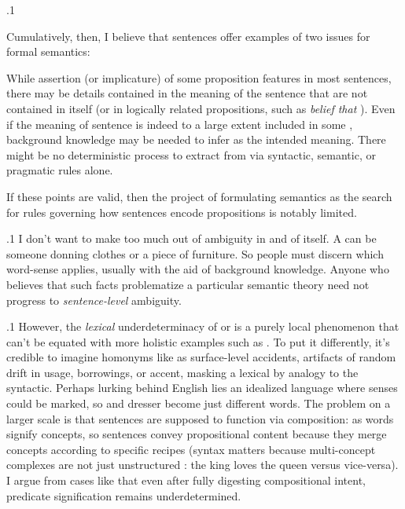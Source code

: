 \documentclass[11pt, twocolumn]{article}
\begin{document}
\p.1{%
\:\+Cumulatively, then, I believe that sentences \onethrft{} offer examples
of two issues for formal semantics:\< \vspace{5pt}

\begin{enums}

\enumsItem{}   \+While assertion (or implicature) of some proposition 
features in most sentences, there may be details contained in
the meaning of the sentence that are not contained in  itself
(or in logically related propositions, such as 
\textit{belief that }).\< 
\enumsItem{}   \+Even if the meaning of sentence  is indeed to a large extent included in some
, background knowledge may be needed to infer  as the intended
meaning. \> There might be no deterministic process to extract  from
 via syntactic, semantic, or pragmatic rules alone.\<

\end{enums}

\nip{}%
\+If these points are valid, then the project of formulating semantics as the search
for rules governing how sentences  encode propositions  is notably limited.\<\;
} %

\p.1{%
\:\+I don't want to make too much out of ambiguity in and of 
itself. \> A  can be someone donning clothes or a piece of furniture. \> So people must 
discern which word-sense applies, usually with the aid of background knowledge. \> Anyone 
who believes that such facts problematize a particular semantic theory
need not progress to \textit{sentence-level} ambiguity.\<\;
} %

\p.1{%
\:\+However, the \textit{lexical} underdeterminacy of  or 
is a purely local phenomenon that can't be equated with more holistic
examples such as \onethrn{}. \> To put it differently,
it's credible to imagine homonyms like 
as surface-level accidents, artifacts of random drift in usage, borrowings, or
accent, masking a lexical
 by analogy to the syntactic. \> Perhaps 
lurking behind English lies an idealized language where senses
could be marked, so  and  dresser become just
different words. \> The problem on a larger scale is that sentences are supposed to
function via composition: as words signify concepts, so sentences
convey propositional content because they merge concepts according
to specific recipes (syntax matters because multi-concept complexes
are not just unstructured : the king loves the queen versus vice-versa). \> I argue 
from cases like \onethrft{} that even after fully digesting
compositional intent, predicate signification remains underdetermined.\<\;
} %
\end{document}
